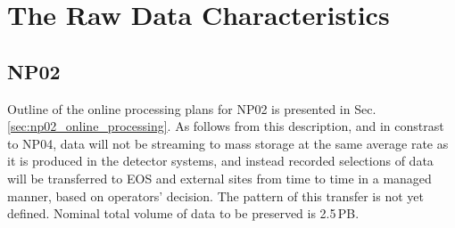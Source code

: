 \documentclass[12pt]{article}
\begin{document}
\section{ The Raw Data Characteristics}
\subsection{NP02}
Outline of the online processing plans for NP02 is presented in Sec.\,\ref{sec:np02_online_processing}.
As follows from this description, and in constrast to NP04, data will not be streaming to mass storage at
the same average rate as it is produced in the detector systems, and instead recorded selections of data
will be transferred to EOS and external sites from time to time in a managed manner, based on operators' decision.
The pattern of this transfer is not yet defined. Nominal total volume of data to be preserved is 2.5\,PB.

\end{document}

